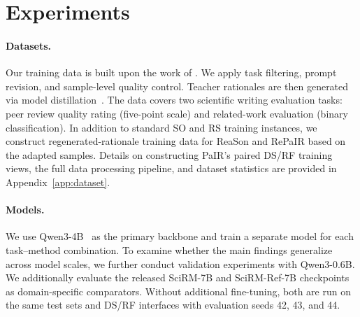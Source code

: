 \section{Experiments}
\label{sec:experimental-design}     %

\paragraph{Datasets.}


Our training data is built upon the work of \citet{sahinuc-etal-2026-reward}.
We apply task filtering, prompt revision, and sample-level quality control.
Teacher rationales are then generated via model
distillation~\citep{hsieh-etal-2023-distilling}.
The data covers two scientific writing evaluation tasks:
peer review quality rating (five-point scale) and related-work evaluation (binary classification).
In addition to standard SO and RS training instances,
we construct regenerated-rationale training data
for ReaSon and RePaIR based on the adapted samples.
Details on constructing PaIR's paired DS/RF training views,
the full data processing pipeline, and dataset statistics
are provided in Appendix~\ref{app:dataset}.

\paragraph{Models.}


We use Qwen3-4B~\citep{yang-etal-2025-qwen3} as the primary backbone
and train a separate model for each task--method combination. To
examine whether the main findings generalize across model scales, we
further conduct validation experiments with Qwen3-0.6B.
We additionally evaluate the released SciRM-7B and SciRM-Ref-7B
checkpoints~\citep{sahinuc-etal-2026-reward} as domain-specific comparators.
Without additional fine-tuning, both are run on the same test sets and DS/RF
interfaces with evaluation seeds 42, 43, and 44.


